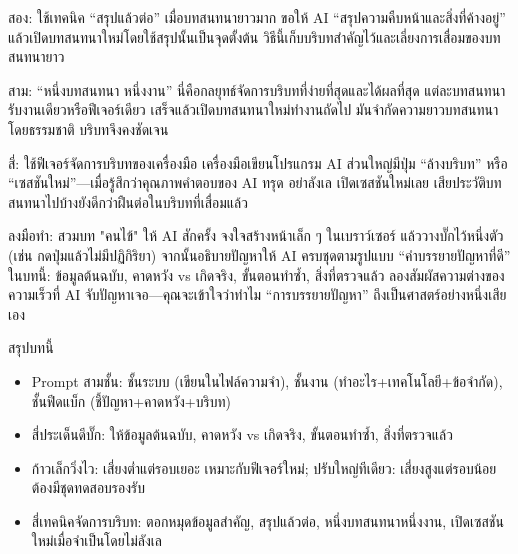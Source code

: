 สอง: ใช้เทคนิค “สรุปแล้วต่อ” เมื่อบทสนทนายาวมาก ขอให้ AI “สรุปความคืบหน้าและสิ่งที่ค้างอยู่” แล้วเปิดบทสนทนาใหม่โดยใช้สรุปนั้นเป็นจุดตั้งต้น วิธีนี้เก็บบริบทสำคัญไว้และเลี่ยงการเสื่อมของบทสนทนายาว

สาม: “หนึ่งบทสนทนา หนึ่งงาน” นี่คือกลยุทธ์จัดการบริบทที่ง่ายที่สุดและได้ผลที่สุด แต่ละบทสนทนารับงานเดียวหรือฟีเจอร์เดียว เสร็จแล้วเปิดบทสนทนาใหม่ทำงานถัดไป มันจำกัดความยาวบทสนทนาโดยธรรมชาติ บริบทจึงคงชัดเจน

สี่: ใช้ฟีเจอร์จัดการบริบทของเครื่องมือ เครื่องมือเขียนโปรแกรม AI ส่วนใหญ่มีปุ่ม “ล้างบริบท” หรือ “เซสชันใหม่”—เมื่อรู้สึกว่าคุณภาพคำตอบของ AI ทรุด อย่าลังเล เปิดเซสชันใหม่เลย เสียประวัติบทสนทนาไปบ้างยังดีกว่าฝืนต่อในบริบทที่เสื่อมแล้ว

\begin{tcbpractice}{ลงมือทำ: สวมบท "คนไข้" ให้ AI สักครั้ง}
จงใจสร้างหน้าเล็ก ๆ ในเบราว์เซอร์ แล้ววางบั๊กไว้หนึ่งตัว (เช่น กดปุ่มแล้วไม่มีปฏิกิริยา) จากนั้นอธิบายปัญหาให้ AI ครบชุดตามรูปแบบ “คำบรรยายปัญหาที่ดี” ในบทนี้: ข้อมูลต้นฉบับ, คาดหวัง vs เกิดจริง, ขั้นตอนทำซ้ำ, สิ่งที่ตรวจแล้ว ลองสัมผัสความต่างของความเร็วที่ AI จับปัญหาเจอ—คุณจะเข้าใจว่าทำไม “การบรรยายปัญหา” ถึงเป็นศาสตร์อย่างหนึ่งเสียเอง

\end{tcbpractice}

\begin{tcbsummary}{สรุปบทนี้}
\begin{itemize}
  \item Prompt สามชั้น: ชั้นระบบ (เขียนในไฟล์ความจำ), ชั้นงาน (ทำอะไร+เทคโนโลยี+ข้อจำกัด), ชั้นฟีดแบ็ก (ชี้ปัญหา+คาดหวัง+บริบท)
  \item สี่ประเด็นดีบั๊ก: ให้ข้อมูลต้นฉบับ, คาดหวัง vs เกิดจริง, ขั้นตอนทำซ้ำ, สิ่งที่ตรวจแล้ว
  \item ก้าวเล็กวิ่งไว: เสี่ยงต่ำแต่รอบเยอะ เหมาะกับฟีเจอร์ใหม่; ปรับใหญ่ทีเดียว: เสี่ยงสูงแต่รอบน้อย ต้องมีชุดทดสอบรองรับ
  \item สี่เทคนิคจัดการบริบท: ตอกหมุดข้อมูลสำคัญ, สรุปแล้วต่อ, หนึ่งบทสนทนาหนึ่งงาน, เปิดเซสชันใหม่เมื่อจำเป็นโดยไม่ลังเล
\end{itemize}

\end{tcbsummary}
